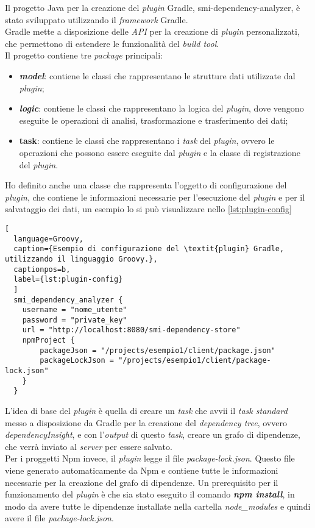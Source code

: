 Il progetto Java per la creazione del \textit{plugin} Gradle, smi-dependency-analyzer, è stato sviluppato utilizzando il \textit{framework} Gradle.\\
Gradle mette a disposizione delle \textit{API} per la creazione di \textit{plugin} personalizzati,
che permettono di estendere le funzionalità del \textit{build tool}.\\
Il progetto contiene tre \textit{package} principali:
\begin{itemize}
  \item \textbf{\textit{model}}: contiene le classi che rappresentano le strutture dati utilizzate dal \textit{plugin};
  \item \textbf{\textit{logic}}: contiene le classi che rappresentano la logica del \textit{plugin}, dove vengono eseguite le operazioni di analisi, 
  trasformazione e trasferimento dei dati;
  \item \textbf{task}: contiene le classi che rappresentano i \textit{task} del \textit{plugin}, ovvero le operazioni che possono essere eseguite dal \textit{plugin} 
  e la classe di registrazione del \textit{plugin}.
\end{itemize}

Ho definito anche una classe che rappresenta l'oggetto di configurazione del \textit{plugin}, 
che contiene le informazioni necessarie per l'esecuzione del \textit{plugin} e per il salvataggio dei dati, un esempio lo si può visualizzare nello \snippet{} \ref*{lst:plugin-config}

\begin{lstlisting}[
  language=Groovy, 
  caption={Esempio di configurazione del \textit{plugin} Gradle, utilizzando il linguaggio Groovy.},
  captionpos=b, 
  label={lst:plugin-config}
  ]
  smi_dependency_analyzer {
    username = "nome_utente"
    password = "private_key"
    url = "http://localhost:8080/smi-dependency-store"
    npmProject {
        packageJson = "/projects/esempio1/client/package.json"
        packageLockJson = "/projects/esempio1/client/package-lock.json"
    }
  }
\end{lstlisting}

L'idea di base del \textit{plugin} è quella di creare un \textit{task} che avvii il \textit{task standard} messo a disposizione da Gradle
per la creazione del \textit{dependency tree}, ovvero \textit{dependencyInsight}, e con l'\textit{output} di questo \textit{task},
creare un grafo di dipendenze, che verrà inviato al \textit{server} per essere salvato.\\
Per i proggetti Npm invece, il \textit{plugin} legge il file \textit{package-lock.json}. Questo file viene generato automaticamente
da Npm e contiene tutte le informazioni necessarie per la creazione del grafo di dipendenze.
Un prerequisito per il funzionamento del \textit{plugin} è che sia stato eseguito il comando \textbf{\textit{npm install}},
in modo da avere tutte le dipendenze installate nella cartella \textit{node\_modules} e quindi avere il file \textit{package-lock.json}.


